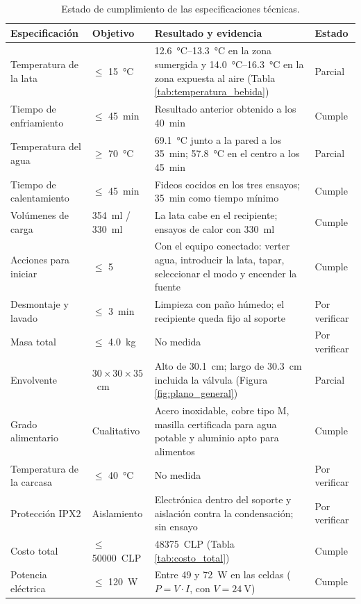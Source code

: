 \documentclass[12pt, a4paper]{article}
\begin{document}
\begin{table}[H]
\centering
\small
\begin{tabularx}{\textwidth}{@{}>{\RaggedRight\arraybackslash}p{3.4cm} >{\Centering\arraybackslash}p{2.2cm} >{\RaggedRight\arraybackslash}X >{\Centering\arraybackslash}p{2.0cm}@{}}
\toprule
\textbf{Especificación} & \textbf{Objetivo} & \textbf{Resultado y evidencia} & \textbf{Estado} \\
\midrule
Temperatura de la lata & $\le$ \SI{15}{\celsius} & \SIrange{12,6}{13,3}{\celsius} en la zona sumergida y \SIrange{14,0}{16,3}{\celsius} en la zona expuesta al aire (Tabla \ref{tab:temperatura_bebida}) & Parcial \\
Tiempo de enfriamiento & $\le$ \SI{45}{\minute} & Resultado anterior obtenido a los \SI{40}{\minute} & Cumple \\
Temperatura del agua & $\ge$ \SI{70}{\celsius} & \SI{69,1}{\celsius} junto a la pared a los \SI{35}{\minute}; \SI{57,8}{\celsius} en el centro a los \SI{45}{\minute} & Parcial \\
Tiempo de calentamiento & $\le$ \SI{45}{\minute} & Fideos cocidos en los tres ensayos; \SI{35}{\minute} como tiempo mínimo & Cumple \\
Volúmenes de carga & \SI{354}{\ml} / \SI{330}{\ml} & La lata cabe en el recipiente; ensayos de calor con \SI{330}{\ml} & Cumple \\
Acciones para iniciar & $\le$ 5 & Con el equipo conectado: verter agua, introducir la lata, tapar, seleccionar el modo y encender la fuente & Cumple \\
Desmontaje y lavado & $\le$ \SI{3}{\minute} & Limpieza con paño húmedo; el recipiente queda fijo al soporte & Por verificar \\
Masa total & $\le$ \SI{4,0}{\kilogram} & No medida & Por verificar \\
Envolvente & $30 \times 30 \times 35$~cm & Alto de \SI{30,1}{\cm}; largo de \SI{30,3}{\cm} incluida la válvula (Figura \ref{fig:plano_general}) & Parcial \\
Grado alimentario & Cualitativo & Acero inoxidable, cobre tipo M, masilla certificada para agua potable y aluminio apto para alimentos & Cumple \\
Temperatura de la carcasa & $\le$ \SI{40}{\celsius} & No medida & Por verificar \\
Protección IPX2 & Aislamiento & Electrónica dentro del soporte y aislación contra la condensación; sin ensayo & Por verificar \\
Costo total & $\le$ \num{50000}~CLP & \num{48375}~CLP (Tabla \ref{tab:costo_total}) & Cumple \\
Potencia eléctrica & $\le$ \SI{120}{\watt} & Entre 49 y \SI{72}{\watt} en las celdas ($P = V \cdot I$, con $V = \SI{24}{\volt}$) & Cumple \\
\bottomrule
\end{tabularx}
\caption{Estado de cumplimiento de las especificaciones técnicas.}
\label{tab:cumplimiento}
\end{table}
\end{document}
